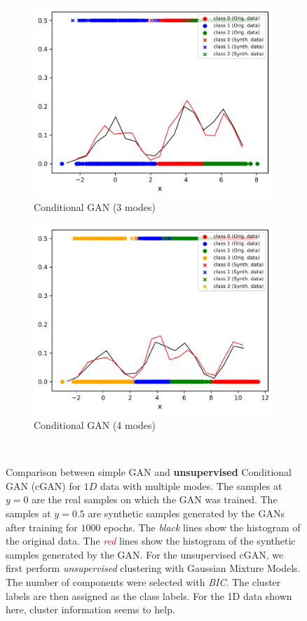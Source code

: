 \documentclass{article} %
\begin{document}
\begin{figure}[h]
	\begin{subfigure}[b]{0.3\textwidth}
		\includegraphics[width=\textwidth]{3_cond_gan_k3_ls9_1000_1000.pdf}
		\caption{Conditional GAN (3 modes)}
		\label{fig:cgan_3}
	\end{subfigure}
	\begin{subfigure}[b]{0.3\textwidth}
		\includegraphics[width=\textwidth]{4_cond_gan_k4_ls9_1000_1000.pdf}
		\caption{Conditional GAN (4 modes)}
		\label{fig:cgan_4}
	\end{subfigure} \\[-1ex]
	\caption{Comparison between simple GAN and {\bf unsupervised} Conditional GAN (cGAN) for $1D$ data with multiple modes. The samples at $y=0$ are the real samples on which the GAN was trained. The samples at $y=0.5$ are synthetic samples generated by the GANs after training for $1000$ epochs. The {\em black} lines show the histogram of the original data. The \textit{\textcolor{red}{red}} lines show the histogram of the synthetic samples generated by the GAN. For the unsupervised cGAN, we first perform {\em unsupervised} clustering with Gaussian Mixture Models. The number of components were selected with {\em BIC}. The cluster labels are then assigned as the class labels. For the 1D data shown here, cluster information seems to help.}

\end{figure}
\end{document}
